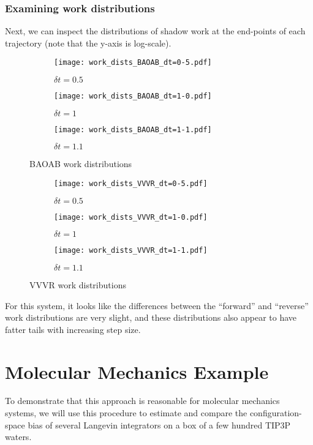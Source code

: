 \documentclass[11pt]{article}
\begin{document}
\subsubsection{Examining work distributions}
Next, we can inspect the distributions of shadow work at the end-points of each trajectory (note that the y-axis is log-scale).
\begin{figure}[h] %
    \centering
    \begin{subfigure}[b]{0.3\textwidth}
        \texttt{[image: work\_dists\_BAOAB\_dt=0-5.pdf]}
        \caption{$\delta t = 0.5$}
    \end{subfigure}
    \begin{subfigure}[b]{0.3\textwidth}
        \texttt{[image: work\_dists\_BAOAB\_dt=1-0.pdf]}
        \caption{$\delta t = 1$}
    \end{subfigure}
    \begin{subfigure}[b]{0.3\textwidth}
        \texttt{[image: work\_dists\_BAOAB\_dt=1-1.pdf]}
        \caption{$\delta t = 1.1$}
    \end{subfigure}
    \caption{BAOAB work distributions}
\end{figure}
\begin{figure}[h] %
    \centering
    \begin{subfigure}[b]{0.3\textwidth}
        \texttt{[image: work\_dists\_VVVR\_dt=0-5.pdf]}
        \caption{$\delta t = 0.5$}
    \end{subfigure}
    \begin{subfigure}[b]{0.3\textwidth}
        \texttt{[image: work\_dists\_VVVR\_dt=1-0.pdf]}
        \caption{$\delta t = 1$}
    \end{subfigure}
    \begin{subfigure}[b]{0.3\textwidth}
        \texttt{[image: work\_dists\_VVVR\_dt=1-1.pdf]}
        \caption{$\delta t = 1.1$}
    \end{subfigure}
    \caption{VVVR work distributions}
\end{figure}

For this system, it looks like the differences between the ``forward'' and ``reverse'' work distributions are very slight, and these distributions also appear to have fatter tails with increasing step size.


\section{Molecular Mechanics Example}
To demonstrate that this approach is reasonable for molecular mechanics systems, we will use this procedure to estimate and compare the configuration-space bias of several Langevin integrators on a box of a few hundred TIP3P waters.
\end{document}
